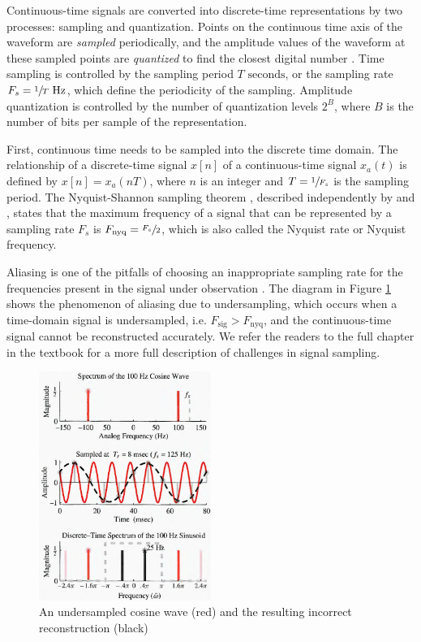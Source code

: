 \documentclass[report.tex]{subfiles}
\begin{document}
Continuous-time signals are converted into discrete-time representations by two processes: sampling and quantization. Points on the continuous time axis of the waveform are \textit{sampled} periodically, and the amplitude values of the waveform at these sampled points are \textit{quantized} to find the closest digital number \parencite{melbook}. Time sampling is controlled by the sampling period $T \text{ seconds}$, or the sampling rate $F_{s} = \sfrac{1}{T} \text{ Hz}$, which define the periodicity of the sampling. Amplitude quantization is controlled by the number of quantization levels $2^{B}$, where $B$ is the number of bits per sample of the representation.

First, continuous time needs to be sampled into the discrete time domain. The relationship of a discrete-time signal $x[n]$ of a continuous-time signal $x_{a}(t)$ is defined by $x[n] = x_{a}(nT)$, where $n$ is an integer and $T = \sfrac{1}{F_{s}}$ is the sampling period. The Nyquist-Shannon sampling theorem \parencite{discretebook}, described independently by \textcite{nyquist1928} and \textcite{shannon1948}, states that the maximum frequency of a signal that can be represented by a sampling rate $F_{s}$ is $F_{\text{nyq}} = \sfrac{F_{s}}{2}$, which is also called the Nyquist rate or Nyquist frequency.

Aliasing is one of the pitfalls of choosing an inappropriate sampling rate for the frequencies present in the signal under observation \parencite{dspfirst}. The diagram in Figure \ref{fig:aliasing} shows the phenomenon of aliasing due to undersampling, which occurs when a time-domain signal is undersampled, i.e. $F_{\text{sig}} > F_{\text{nyq}}$, and the continuous-time signal cannot be reconstructed accurately. We refer the readers to the full chapter in the textbook for a more full description of challenges in signal sampling.

\begin{figure}[ht]
	\centering
	\includegraphics[width=0.5\textwidth]{./images-tftheory/aliasing_undersampling.png}
	\caption{An undersampled cosine wave (red) and the resulting incorrect reconstruction (black) \parencite[82]{dspfirst}}
	\label{fig:aliasing}
\end{figure}
\end{document}
